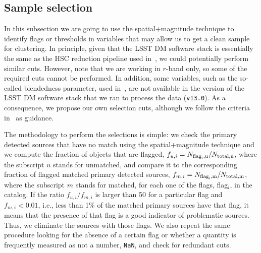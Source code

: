 \documentclass[\docopts]{\docclass}
\begin{document}
\subsection{Sample selection}
\label{ssec:sample_selection}

In this subsection we are going to use the spatial+magnitude technique to identify flags or thresholds in variables that may allow us to get a clean sample for clustering. In principle, given that the LSST DM software stack is essentially the same as the HSC reduction pipeline used in~\citet{2018PASJ...70S..25M}, we could potentially perform similar cuts. However, note that we are working in $r$-band only, so some of the required cuts cannot be performed. In addition, some variables, such as the so-called blendedness parameter, used in~\citet{2018PASJ...70S..25M}, are not available in the version of the LSST DM software stack that we ran to process the data (\texttt{v13.0}). As a consequence, we propose our own selection cuts, although we follow the criteria in~\citet{2018PASJ...70S..25M} as guidance.


The methodology to perform the selections is simple: we check the primary detected sources that have no match using the spatial+magnitude technique and we compute the fraction of objects that are flagged, $f_{u,i} = N_{\rm{flag}_{i}, u}/N_{\rm{total}, u}$, where the subscript $u$ stands for unmatched, and compare it to the corresponding fraction of flagged matched primary detected sources, $f_{m,i} = N_{\rm{flag}_{i}, m}/N_{\rm{total}, m}$, where the subscript $m$ stands for matched, for each one of the flags, flag$_{i}$, in the catalog. If the ratio $f_{u,i}/f_{m,i}$ is larger than 50 for a particular flag and $f_{m,i} < 0.01$, i.e., less than 1\% of the matched primary sources have that flag, it means that the presence of that flag is a good indicator of problematic sources. Thus, we eliminate the sources with those flags. We also repeat the same procedure looking for the absence of a certain flag or whether a quantity is frequently measured as not a number, \texttt{NaN}, and check for redundant cuts. 


\end{document}
